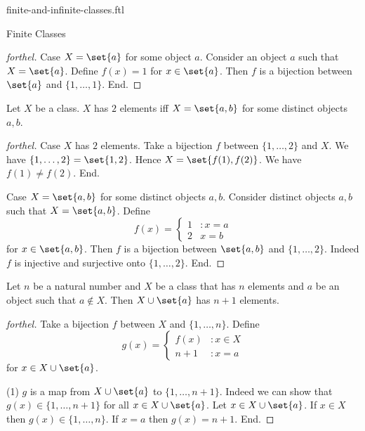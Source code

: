 \documentclass{naproche-library}
\begin{document}
\begin{smodule}[title=Finite and Infinite Classes]{finite-and-infinite-classes.ftl}
\begin{sfragment}{Finite Classes}
\begin{proof}[forthel]
    Case $X = \set{a}$ for some object $a$.
      Consider an object $a$ such that $X = \set{a}$.
      Define $f(x) = 1$ for $x \in \set{a}$.
    Then $f$ is a bijection between $\set{a}$ and $\{ 1, \dots, 1 \}$.
    End.
  \end{proof}

  \begin{proposition}[forthel,id=FOUNDATIONS_14_3468912675458910]
    Let $X$ be a class.
    $X$ has $2$ elements iff $X = \set{a, b}$ for some distinct objects $a, b$.
  \end{proposition}
  \begin{proof}[forthel]
    Case $X$ has $2$ elements.
      Take a bijection $f$ between $\{ 1, \dots, 2 \}$ and $X$.
      We have $\{ 1, \dots, 2 \} = \set{1, 2}$.
      Hence $X = \set{f(1), f(2)}$.
      We have $f(1) \neq f(2)$.
    End.

    Case $X = \set{a, b}$ for some distinct objects $a, b$.
      Consider distinct objects $a, b$ such that $X = \set{a, b}$.
      Define \[f(x) =
        \begin{cases}
          1 & : x = a \\
          2 & x = b
        \end{cases}\]
      for $x \in \set{a, b}$.
      Then $f$ is a bijection between $\set{a, b}$ and $\{ 1, \dots, 2 \}$.
      Indeed $f$ is injective and surjective onto $\{ 1, \dots, 2 \}$.
    End.
  \end{proof}

  \begin{proposition}[forthel,id=FOUNDATIONS_14_0615204230800975]
    Let $n$ be a natural number and $X$ be a class that has $n$ elements and $a$ be an object such that $a \notin X$.
    Then $X \cup \set{a}$ has $n + 1$ elements.
  \end{proposition}
  \begin{proof}[forthel]
    Take a bijection $f$ between $X$ and $\{ 1, \dots, n \}$.
    Define \[g(x) =
      \begin{cases}
        f(x)  & : x \in X \\
        n + 1 & : x = a
      \end{cases}\]
    for $x \in X \cup \set{a}$.

    (1) $g$ is a map from $X \cup \set{a}$ to $\{ 1, \dots, n + 1 \}$. \newline
    Indeed we can show that $g(x) \in \{ 1, \dots, n + 1 \}$ for all $x \in X \cup \set{a}$.
      Let $x \in X \cup \set{a}$.
      If $x \in X$ then $g(x) \in \{ 1, \dots, n \}$.
      If $x = a$ then $g(x) = n + 1$.
    End.


\end{proof}
\end{sfragment}
\end{smodule}
\end{document}
